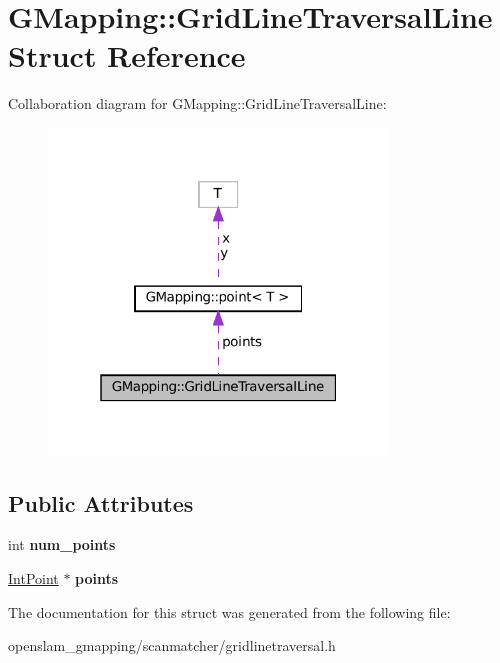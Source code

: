\hypertarget{structGMapping_1_1GridLineTraversalLine}{}\section{G\+Mapping\+:\+:Grid\+Line\+Traversal\+Line Struct Reference}
\label{structGMapping_1_1GridLineTraversalLine}


Collaboration diagram for G\+Mapping\+:\+:Grid\+Line\+Traversal\+Line\+:
\nopagebreak
\begin{figure}[H]
\begin{center}
\leavevmode
\includegraphics[width=256pt]{structGMapping_1_1GridLineTraversalLine__coll__graph}
\end{center}
\end{figure}
\subsection*{Public Attributes}
\begin{DoxyCompactItemize}
\item 
\mbox{\label{structGMapping_1_1GridLineTraversalLine_a9907a16751e75c0cbf233d64eff84354}} 
int {\bfseries num\+\_\+points}
\item 
\mbox{\label{structGMapping_1_1GridLineTraversalLine_a2c1f79400ce9d62c18cd86bc2fac3255}} 
\hyperlink{structGMapping_1_1point}{Int\+Point} $\ast$ {\bfseries points}
\end{DoxyCompactItemize}


The documentation for this struct was generated from the following file\+:\begin{DoxyCompactItemize}
\item 
openslam\+\_\+gmapping/scanmatcher/gridlinetraversal.\+h\end{DoxyCompactItemize}
